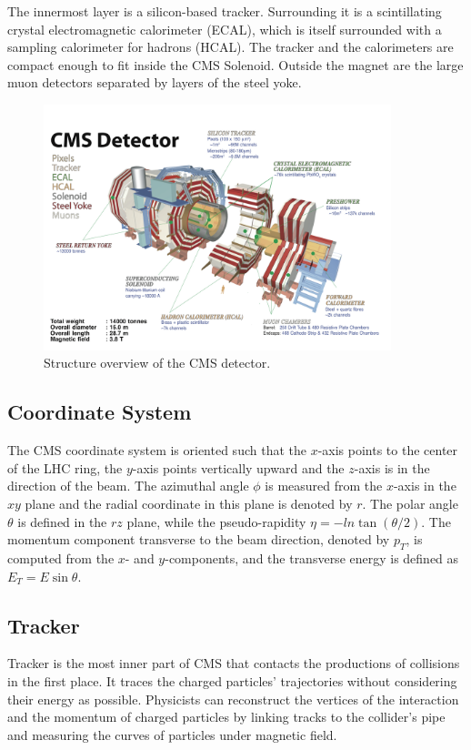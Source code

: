 The innermost layer is a silicon-based tracker. Surrounding it is a scintillating crystal electromagnetic calorimeter (ECAL), which is itself surrounded with a sampling calorimeter for hadrons (HCAL). The tracker and the calorimeters are compact enough to fit inside the CMS Solenoid. Outside the magnet are the large muon detectors separated by layers of the steel yoke.

\begin{figure}[hbtp]
  \begin{center}
    \includegraphics[width=0.9\textwidth]{figure/CH2/CMS.png}
  \end{center}
  \caption{\label{fig:CMS}Structure overview of the CMS detector.}
\end{figure}
\subsection*{Coordinate System}

The CMS coordinate system is oriented such that the $x$-axis points to the center of the LHC ring, the $y$-axis points vertically upward and the $z$-axis is in the direction of the beam. The azimuthal angle $\phi$ is measured from the $x$-axis in the $xy$ plane and the radial coordinate in this plane is denoted by $r$. The polar angle $\theta$ is defined in the $rz$ plane, while the pseudo-rapidity $\eta=-ln\tan{(\theta/2)}$. The momentum component transverse to the beam direction, denoted by $p_{T}$, is computed from the $x$- and $y$-components, and the transverse energy is defined as $E_{T}=E\sin\theta$.

\subsection{Tracker}
Tracker is the most inner part of CMS that contacts the productions of collisions in the first place. It traces the charged particles' trajectories without considering their energy as possible. Physicists can reconstruct the vertices of the interaction and the momentum of charged particles by linking tracks to the collider's pipe and measuring the curves of particles under magnetic field.

